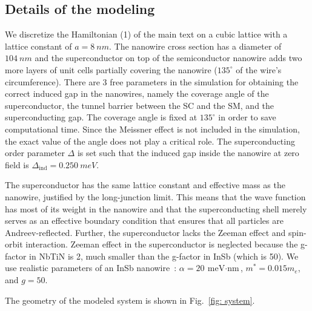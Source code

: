 \subsection{Details of the modeling}

We discretize the Hamiltonian (1) of the main text on a cubic lattice with a lattice constant of $a=\SI{8}{nm}$.
The nanowire cross section has a diameter of $\SI{104}{nm}$ and the superconductor on top of the semiconductor nanowire adds two more layers of unit cells partially covering the nanowire ($135^{\circ}$ of the wire's circumference). There are 3 free parameters in the simulation for obtaining the correct induced gap in the nanowires, namely the coverage angle of the superconductor, the tunnel barrier between the SC and the SM, and the superconducting gap. The coverage angle is fixed at $135^{\circ}$ in order to save computational time. Since the Meissner effect is not included in the simulation, the exact value of the angle does not play a critical role. The superconducting order parameter $\Delta$ is set such that the induced gap inside the nanowire at zero field is $\Delta_\textrm{ind} = \SI{0.250}{meV}$.

The superconductor has the same lattice constant and effective mass as the nanowire, justified by the long-junction limit.
This means that the wave function has most of its weight in the nanowire and that the superconducting shell merely serves as an effective boundary condition that ensures that all particles are Andreev-reflected.
Further, the superconductor lacks the Zeeman effect and spin-orbit interaction. Zeeman effect in the superconductor is neglected because the g-factor in NbTiN is 2, much smaller than the g-factor in InSb (which is 50). 
We use realistic parameters of an InSb nanowire~\cite{Mourik2012}:  $\alpha=\SI{20}{\meV\cdot\nm}$, $m^{*}=0.015 m_e$, and $g=50$. 

The geometry of the modeled system is shown in Fig.~\ref{fig: system}.

